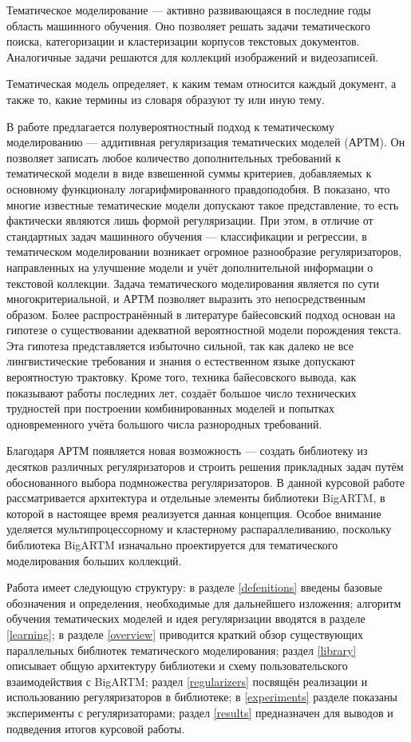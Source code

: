 
Тематическое моделирование --- активно развивающаяся в последние годы область машинного обучения. Оно позволяет решать задачи тематического поиска, категоризации и кластеризации корпусов текстовых документов. Аналогичные задачи решаются для коллекций изображений и видеозаписей.

Тематическая модель определяет, к каким темам относится каждый документ, а также то, какие термины из словаря образуют ту или иную тему.

В работе \cite{voron2014} предлагается полувероятностный подход к тематическому моделированию --- аддитивная регуляризация тематических моделей (АРТМ). Он позволяет записать любое количество дополнительных требований к тематической модели в виде взвешенной суммы критериев, добавляемых к основному функционалу логарифмированного правдоподобия. В \cite{voron2014} показано, что многие известные тематические модели допускают такое представление, то есть фактически являются лишь формой регуляризации. При этом, в отличие от стандартных задач машинного обучения --- классификации и регрессии, в тематическом моделировании возникает огромное разнообразие регуляризаторов, направленных на улучшение модели и учёт дополнительной информации о текстовой коллекции. Задача тематического моделирования является по сути многокритериальной, и АРТМ позволяет выразить это непосредственным образом. Более распространённый в литературе байесовский подход основан на гипотезе о существовании адекватной вероятностной модели порождения текста. Эта гипотеза представляется избыточно сильной, так как далеко не все лингвистические требования и знания о естественном языке допускают вероятностую трактовку. Кроме того, техника байесовского вывода, как показывают работы последних лет, создаёт большое число технических трудностей при построении комбинированных моделей и попытках одновременного учёта большого числа разнородных требований.

Благодаря АРТМ появляется новая возможность --- создать библиотеку из десятков различных регуляризаторов и строить решения прикладных задач путём обоснованного выбора  подмножества регуляризаторов. В данной курсовой работе рассматривается архитектура и отдельные элементы библиотеки BigARTM, в которой в настоящее время реализуется данная концепция. Особое внимание уделяется мультипроцессорному и кластерному распараллеливанию, поскольку библиотека BigARTM изначально проектируется для тематического моделирования больших коллекций.   

Работа имеет следующую структуру: в разделе \ref{defenitions} введены базовые обозначения и определения, необходимые для дальнейшего изложения; алгоритм обучения тематических моделей и идея регуляризации вводятся в разделе \ref{learning}; в разделе \ref{overview} приводится краткий обзор существующих параллельных библиотек тематического моделирования; раздел \ref{library} описывает общую архитектуру библиотеки и схему пользовательского взаимодействия с BigARTM; раздел \ref{regularizers} посвящён реализации и использованию регуляризаторов в библиотеке; в \ref{experiments} разделе показаны эксперименты с регуляризаторами; раздел \ref{results} предназначен для выводов и подведения итогов курсовой работы.